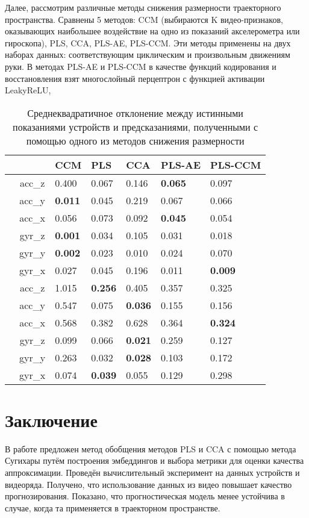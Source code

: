 \documentclass[a4paper, 12pt]{article}
\begin{document}
Далее, рассмотрим различные методы снижения размерности траекторного пространства. 
Сравнены 5 методов: CCM (выбираются K видео-признаков, оказывающих наибольшее воздействие на одно из показаний акселерометра или гироскопа), PLS, CCA, PLS-AE, PLS-CCM. 
Эти методы применены на двух наборах данных: соответствующим циклическим и произвольным движениям руки.
В методах PLS-AE и PLS-CCM в качестве функций кодирования и восстановления взят многослойный перцептрон с функцией активации LeakyReLU, 

\begin{table}[bhtp]
	\centering
	\caption{Среднеквадратичное отклонение между истинными показаниями устройств и предсказаниями, полученными с помощью одного из методов снижения размерности}
	\label{tbl:methods}
	\begin{tabular}{l|c|lllll}
		\hline
		\multicolumn{2}{l}{\diaghead{\hskip4cm}{Целевой признак}{Метод}} \vline & CCM & PLS & CCA & PLS-AE & PLS-CCM \\
		\hline
		\multirow{6}{*}{\rotatebox[origin=c]{90}{cyclic}} & acc\_z & 0.400 & 0.067 & 0.146 & \textbf{0.065} & 0.097 \\
		& acc\_y & \textbf{0.011} & 0.045 & 0.219 & 0.067 & 0.066 \\
		& acc\_x & {0.056} & 0.073 & 0.092 & \textbf{0.045} & 0.054 \\
		& gyr\_z & \textbf{0.001} & 0.034 & 0.105 & 0.031 & 0.018 \\
		& gyr\_y & \textbf{0.002} & 0.023 & 0.010 & 0.024 & 0.070 \\
		& gyr\_x & {0.027} & 0.045 & 0.196 & 0.011 & \textbf{0.009} \\
		\hline
		\multirow{6}{*}{\rotatebox[origin=c]{90}{chaotic}} & acc\_z & 1.015 & \textbf{0.256} & 0.405 & 0.357 & 0.325 \\
		& acc\_y & 0.547 & 0.075 & \textbf{0.036} & 0.155 & 0.156 \\
		& acc\_x & {0.568} & 0.382 & 0.628 & 0.364 & \textbf{0.324} \\
		& gyr\_z & {0.099} & 0.066 & \textbf{0.021} & 0.259 & 0.127 \\
		& gyr\_y & {0.263} & 0.032 & \textbf{0.028} & 0.103 & 0.172 \\
		& gyr\_x & {0.074} & \textbf{0.039} & 0.055 & 0.129 & 0.298 \\
		\hline   
	\end{tabular}
\end{table}

\section{Заключение}
В работе предложен метод обобщения методов PLS и CCA с помощью метода Сугихары путём построения эмбеддингов и выбора метрики для оценки качества аппроксимации.  
Проведён вычислительный эксперимент на данных устройств и видеоряда. 
Получено, что использование данных из видео повышает качество прогнозирования. 
Показано, что прогностическая модель менее устойчива в случае, когда та применяется в траекторном пространстве.
\end{document}
